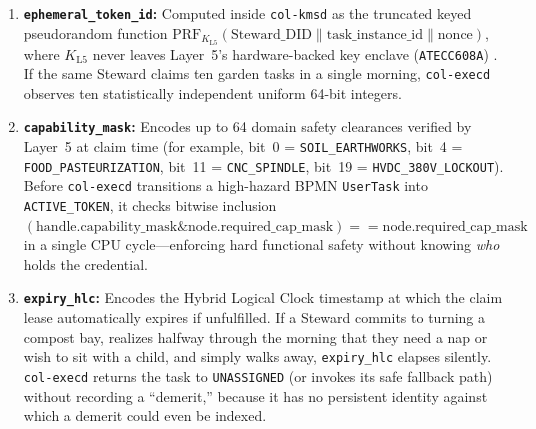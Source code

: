 \begin{enumerate}
\item \textbf{\texttt{ephemeral\_token\_id}:} Computed inside \texttt{col-kmsd} as the
        truncated keyed pseudorandom function
        $\mathrm{PRF}_{K_{\mathrm{L5}}}(\mathrm{Steward\_DID} \parallel \mathrm{task\_instance\_id} \parallel \mathrm{nonce})$,
        where $K_{\mathrm{L5}}$ never leaves Layer~5's hardware-backed key enclave
        (\texttt{ATECC608A}) \parencite{microchip_atecc608a}. If the same Steward claims ten
        garden tasks in a single morning, \texttt{col-execd} observes ten statistically
        independent uniform 64-bit integers.
    \item \textbf{\texttt{capability\_mask}:} Encodes up to 64 domain safety clearances verified by Layer~5 at claim time (for example, bit~0 = \texttt{SOIL\_EARTHWORKS}, bit~4 = \texttt{FOOD\_PASTEURIZATION}, bit~11 = \texttt{CNC\_SPINDLE}, bit~19 = \texttt{HVDC\_380V\_LOCKOUT}). Before \texttt{col-execd} transitions a high-hazard BPMN \texttt{UserTask} into \texttt{ACTIVE\_TOKEN}, it checks bitwise inclusion $(\mathrm{handle.capability\_mask} \mathbin{\&} \mathrm{node.required\_cap\_mask}) == \mathrm{node.required\_cap\_mask}$ in a single CPU cycle---enforcing hard functional safety \parencite{iec61508} without knowing \textit{who} holds the credential.
\item \textbf{\texttt{expiry\_hlc}:} Encodes the Hybrid Logical Clock timestamp at which the
        claim lease automatically expires if unfulfilled. If a Steward commits to turning a
        compost bay, realizes halfway through the morning that they need a nap or wish to
        sit with a child, and simply walks away, \texttt{expiry\_hlc} elapses silently.
        \texttt{col-execd} returns the task to \texttt{UNASSIGNED} (or invokes its safe
        fallback path) without recording a ``demerit,'' because it has no persistent
        identity against which a demerit could even be indexed.
\end{enumerate}


